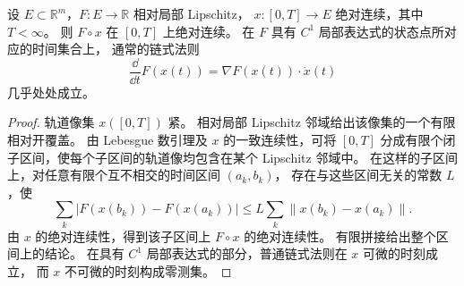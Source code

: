 \begin{lemma}
\label{lem:ac-composition}
设 $E\subset\mathbb R^m$，$F:E\to\mathbb R$ 相对局部 Lipschitz，
$x:[0,T]\to E$ 绝对连续，其中 $T<\infty$。
则 $F\circ x$ 在 $[0,T]$ 上绝对连续。
在 $F$ 具有 $C^1$ 局部表达式的状态点所对应的时间集合上，
通常的链式法则
\[
 \frac{\dd}{\dd t}F(x(t))=\nabla F(x(t))\cdot\dot x(t)
\]
几乎处处成立。
\end{lemma}
\begin{proof}
轨道像集 $x([0,T])$ 紧。
相对局部 Lipschitz 邻域给出该像集的一个有限相对开覆盖。
由 Lebesgue 数引理及 $x$ 的一致连续性，可将 $[0,T]$
分成有限个闭子区间，使每个子区间的轨道像均包含在某个
Lipschitz 邻域中。
在这样的子区间上，对任意有限个互不相交的时间区间 $(a_k,b_k)$，
存在与这些区间无关的常数 $L$，使
\[
 \sum_k |F(x(b_k))-F(x(a_k))|
 \le L\sum_k\|x(b_k)-x(a_k)\|.
\]
由 $x$ 的绝对连续性，得到该子区间上 $F\circ x$ 的绝对连续性。
有限拼接给出整个区间上的结论。
在具有 $C^1$ 局部表达式的部分，普通链式法则在 $x$ 可微的时刻成立，
而 $x$ 不可微的时刻构成零测集。
\end{proof}
